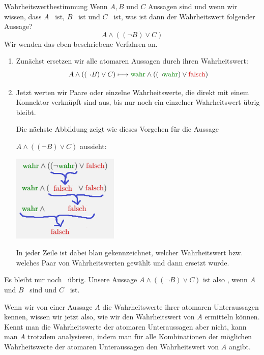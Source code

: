 \documentclass[../../main.tex]{subfiles}
\begin{document}
\begin{example}{Wahrheitswertbestimmung}
Wenn $A,B$ und $C$ Aussagen sind und wenn wir wissen, dass $A$ \wahr\  ist, $B$ \wahr\  ist und $C$ \falsch\   ist, was ist dann der Wahrheitswert folgender Aussage?
\[A \land ( (\lnot B) \lor C)\]
Wir wenden das eben beschriebene Verfahren an.
\begin{enumerate}
    \item Zunächst ersetzen wir alle atomaren Aussagen durch ihren Wahrheitswert:
    \[A \land ( (\lnot B) \lor C) \longmapsto  \wahr \land ((\lnot \wahr) \lor \falsch)\]
    \item Jetzt werten wir Paare oder einzelne Wahrheitswerte, 
    die direkt mit einem Konnektor verknüpft sind aus, bis nur noch ein einzelner Wahrheitswert
    übrig bleibt.
    
    Die nächste Abbildung zeigt wie dieses Vorgehen für die 
    Aussage 
    
    $A \land ( (\lnot B) \lor C)$ aussieht:

\begin{center}
\includegraphics[width=0.4\textwidth]{images/TEMP_wahrheitsalg.png}
\end{center}

In jeder Zeile ist 
    dabei blau gekennzeichnet, welcher Wahrheitswert bzw. welches Paar von 
    Wahrheitswerten gewählt und dann ersetzt wurde. 
\end{enumerate}
Es bleibt nur noch \falsch\  übrig. Unsere Aussage $A \land ( (\lnot B) \lor C)$ ist also
\falsch, wenn $A$ und $B$ \wahr\ sind und $C$ \falsch\ ist.
\end{example}
Wenn wir von einer Aussage $A$ die Wahrheitswerte ihrer atomaren Unteraussagen
kennen, wissen wir jetzt also, wie wir den Wahrheitswert von $A$ ermitteln können. 
Kennt man die Wahrheitswerte der atomaren Unteraussagen aber nicht, kann man $A$ 
trotzdem analysieren, indem man für alle Kombinationen der möglichen Wahrheitswerte 
der atomaren Unteraussagen den Wahrheitswert von $A$ angibt.
\end{document}
